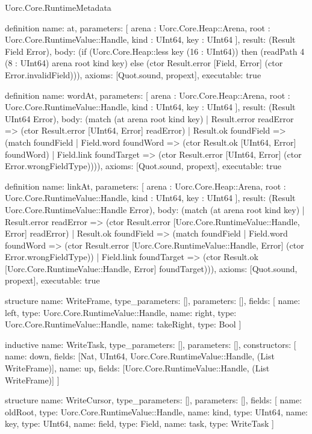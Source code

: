 \begin{lexlean}{Uorc.Core.RuntimeMetadata}
\begin{semanticmodule}
definition{
  name: at,
  parameters: [
    arena : Uorc.Core.Heap::Arena,
    root : Uorc.Core.RuntimeValue::Handle,
    kind : UInt64,
    key : UInt64
  ],
  result: (Result Field Error),
  body: (if (Uorc.Core.Heap::less key (16 : UInt64)) then (readPath 4 (8 : UInt64) arena root kind key) else (ctor Result.error [Field, Error] (ctor Error.invalidField))),
  axioms: [Quot.sound, propext],
  executable: true
}

definition{
  name: wordAt,
  parameters: [
    arena : Uorc.Core.Heap::Arena,
    root : Uorc.Core.RuntimeValue::Handle,
    kind : UInt64,
    key : UInt64
  ],
  result: (Result UInt64 Error),
  body: (match (at arena root kind key)
    | Result.error readError => (ctor Result.error [UInt64, Error] readError)
    | Result.ok foundField => (match foundField
      | Field.word foundWord => (ctor Result.ok [UInt64, Error] foundWord)
      | Field.link foundTarget => (ctor Result.error [UInt64, Error] (ctor Error.wrongFieldType)))),
  axioms: [Quot.sound, propext],
  executable: true
}

definition{
  name: linkAt,
  parameters: [
    arena : Uorc.Core.Heap::Arena,
    root : Uorc.Core.RuntimeValue::Handle,
    kind : UInt64,
    key : UInt64
  ],
  result: (Result Uorc.Core.RuntimeValue::Handle Error),
  body: (match (at arena root kind key)
    | Result.error readError => (ctor Result.error [Uorc.Core.RuntimeValue::Handle, Error] readError)
    | Result.ok foundField => (match foundField
      | Field.word foundWord => (ctor Result.error [Uorc.Core.RuntimeValue::Handle, Error] (ctor Error.wrongFieldType))
      | Field.link foundTarget => (ctor Result.ok [Uorc.Core.RuntimeValue::Handle, Error] foundTarget))),
  axioms: [Quot.sound, propext],
  executable: true
}

structure{
  name: WriteFrame,
  type_parameters: [],
  parameters: [],
  fields: [
    {name: left, type: Uorc.Core.RuntimeValue::Handle},
    {name: right, type: Uorc.Core.RuntimeValue::Handle},
    {name: takeRight, type: Bool}
  ]
}

inductive{
  name: WriteTask,
  type_parameters: [],
  parameters: [],
  constructors: [
    {name: down, fields: [Nat, UInt64, Uorc.Core.RuntimeValue::Handle, (List WriteFrame)]},
    {name: up, fields: [Uorc.Core.RuntimeValue::Handle, (List WriteFrame)]}
  ]
}

structure{
  name: WriteCursor,
  type_parameters: [],
  parameters: [],
  fields: [
    {name: oldRoot, type: Uorc.Core.RuntimeValue::Handle},
    {name: kind, type: UInt64},
    {name: key, type: UInt64},
    {name: field, type: Field},
    {name: task, type: WriteTask}
  ]
}


\end{semanticmodule}
\end{lexlean}
